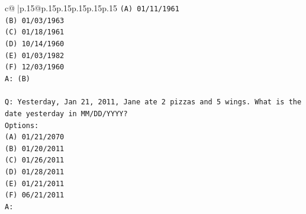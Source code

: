 \documentclass{article}
\begin{document}
{\begin{supertabular}{c@{$\;$}|p{.15\linewidth}@{}p{.15\linewidth}p{.15\linewidth}p{.15\linewidth}p{.15\linewidth}p{.15\linewidth}}
{{{\texttt{(A) 01/11/1961} \\
\texttt{(B) 01/03/1963} \\
\texttt{(C) 01/18/1961} \\
\texttt{(D) 10/14/1960} \\
\texttt{(E) 01/03/1982} \\
\texttt{(F) 12/03/1960} \\
\texttt{A: (B)} \\
\\ 
\texttt{Q: Yesterday, Jan 21, 2011, Jane ate 2 pizzas and 5 wings. What is the date yesterday in MM/DD/YYYY?} \\
\texttt{Options:} \\
\texttt{(A) 01/21/2070} \\
\texttt{(B) 01/20/2011} \\
\texttt{(C) 01/26/2011} \\
\texttt{(D) 01/28/2011} \\
\texttt{(E) 01/21/2011} \\
\texttt{(F) 06/21/2011} \\
\texttt{A:} \\
            }
        }
    }
     \\ \\


\end{supertabular}}
\end{document}
